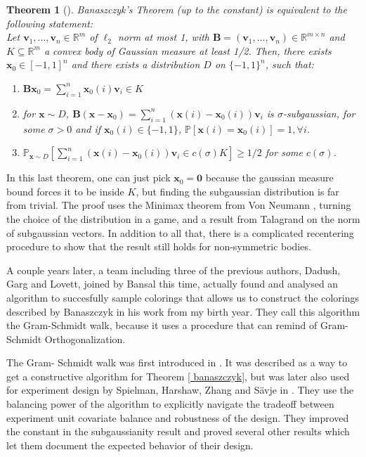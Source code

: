 \documentclass[12pt]{article}
\newtheorem{theorem}{Theorem}
\begin{document}
\begin{theorem}[\cite{construct}]\label{equivalence}
Banaszczyk's Theorem (up to the constant) is equivalent to the following statement:\\
Let $\textbf{v}_1, \dots, \textbf{v}_n \in \mathbb{R}^m$ of $\ell_2$ norm at most 1, with $\textbf{B}= (\textbf{v}_1, \dots, \textbf{v}_n) \in \mathbb{R}^{m \times n}$ and $K \subseteq \mathbb{R}^m$ a convex body  of Gaussian measure at least 1/2.
Then, there exists $\textbf{x}_0 \in [-1,1]^n$ and there exists a distribution $D$ on $\{-1,1\}^n$, such that: 
\begin{enumerate}
    \item  $\textbf{B}\textbf{x}_0 = \sum_{i=1}^n \textbf{x}_0(i)\textbf{v}_i \in K$\\
    \item  for $\textbf{x} \sim D$, $\textbf{B}(\textbf{x}-\textbf{x}_0)= \sum_{i=1}^n (\textbf{x}(i)-\textbf{x}_0(i))\textbf{v}_i$ is $\sigma$-subgaussian, for some $\sigma >0$ and if $\textbf{x}_0(i) \in \{-1, 1\}$, $\mathbb{P}[\textbf{x}(i)=\textbf{x}_0(i)]=1, \forall i$.
    \item $\mathbb{P}_{\textbf{x} \sim D}[\sum_{i=1}^n (\textbf{x}(i)- \textbf{x}_0(i))\textbf{v}_i \in c(\sigma)K] \geq 1/2$ for some $c(\sigma)$.
\end{enumerate}
\end{theorem}
In this last theorem, one can just pick $\textbf{x}_0=\textbf{0}$ because the gaussian measure bound forces it to be inside $K$, but finding the subgaussian distribution is far from trivial. The proof uses the Minimax theorem from Von Neumann \cite{neumann1928theorie}, turning the choice of the distribution in a game, and a result from Talagrand \cite{talagrand2005generic} on the norm of subgaussian vectors. In addition to all that, there is a complicated recentering procedure to show that the result still holds for non-symmetric bodies.

A couple years later, a team including three of the previous authors, Dadush, Garg and Lovett, joined by Bansal this time, actually found and analysed an algorithm to succesfully sample colorings that allows us to construct the colorings described by Banaszczyk in his work from my birth year. They call this algorithm the Gram-Schmidt walk, because it uses a procedure that can remind of Gram-Schmidt Orthogonalization. 

The Gram- Schmidt walk was first introduced in \cite{blues}. It was described as a way to get a constructive algorithm for Theorem \ref{ banaszczyk}, but was later also used for experiment design by Spielman, Harshaw, Zhang and Sävje in \cite{harshaw2019balancing}. They use the balancing power of the algorithm to explicitly navigate the tradeoff between experiment unit covariate balance and robustness of the design. They improved the constant in the subgaussianity result and proved several other results which let them document the expected behavior of their design.
\end{document}
